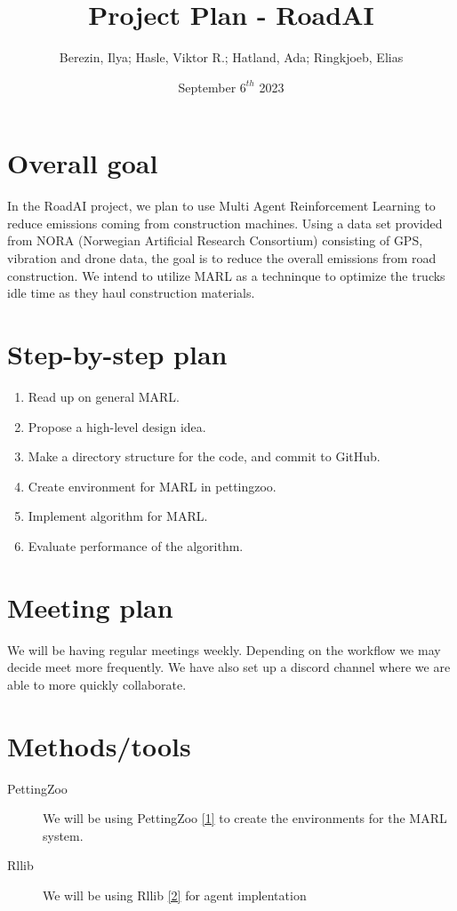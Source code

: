 \documentclass{article}
\title{Project Plan - RoadAI}
\author{Berezin, Ilya; Hasle, Viktor R.; Hatland, Ada; Ringkjoeb, Elias}
\date{September $6^{th}$ 2023}
\begin{document}
\begin{titlepage}
\maketitle
\tableofcontents
\end{titlepage}


\section{Overall goal}
In the RoadAI project, we plan to use Multi Agent Reinforcement Learning to reduce emissions coming from
construction machines. Using a data set provided from NORA (Norwegian Artificial Research Consortium) consisting of GPS, vibration and drone data, the goal is to reduce the overall emissions from road construction. We intend to utilize MARL as a techninque to optimize
the trucks idle time as they haul construction materials.

\section{Step-by-step plan}
\begin{enumerate}
  \item Read up on general MARL.\\
  \item Propose a high-level design idea.\\
  \item Make a directory structure for the code, and commit to GitHub.\\
  \item Create environment for MARL in pettingzoo.\\
  \item Implement algorithm for MARL. \\
  \item Evaluate performance of the algorithm.
\end{enumerate}


\section{Meeting plan}
We will be having regular meetings weekly. Depending on the workflow we may decide meet more frequently.
We have also set up a discord channel where we are able to more quickly collaborate.
\section{Methods/tools}
\begin{description}
  \item[PettingZoo] We will be using PettingZoo \href{https://pettingzoo.farama.org}{[1]} to create the environments for the MARL system.
  \item[Rllib] We will be using Rllib \href{https://docs.ray.io/en/latest/rllib/index.html}{[2]} for agent implentation
\end{description}
\end{document}
